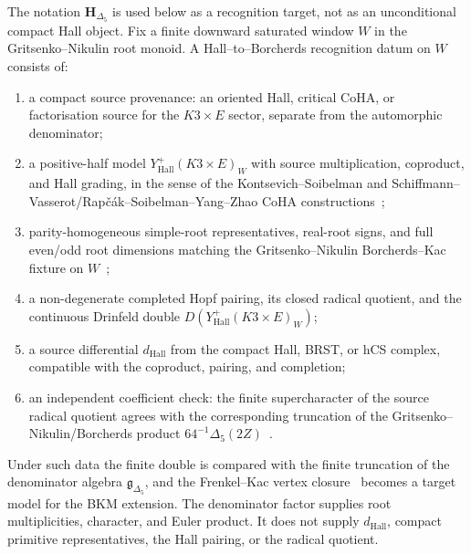 \begin{remark}
\label{rem:ckp-hall-drinfeld-pair}
The notation $\mathbf H_{\Delta_5}$ is used below as a recognition target,
not as an unconditional compact Hall object.  Fix a finite downward
saturated window $W$ in the Gritsenko--Nikulin root monoid.  A
Hall--to--Borcherds recognition datum on $W$ consists of:
\begin{enumerate}
\item a compact source provenance: an oriented Hall, critical CoHA, or
factorisation source for the $K3\times E$ sector, separate from the
automorphic denominator;
\item a positive-half model $Y^+_{\mathrm{Hall}}(K3\times E)_W$ with
source multiplication, coproduct, and Hall grading, in the sense of the
Kontsevich--Soibelman and Schiffmann--Vasserot/Rap\v{c}\'ak--Soibelman--Yang--Zhao
CoHA constructions~\cite{KS11,SchiffmannVasserot2012,RSYZ20};
\item parity-homogeneous simple-root representatives, real-root signs,
and full even/odd root dimensions matching the Gritsenko--Nikulin
Borcherds--Kac fixture on $W$~\cite{GritsenkoNikulin1998,KacBook};
\item a non-degenerate completed Hopf pairing, its closed radical
quotient, and the continuous Drinfeld double
$D(Y^+_{\mathrm{Hall}}(K3\times E)_W)$;
\item a source differential $d_{\mathrm{Hall}}$ from the compact Hall,
BRST, or hCS complex, compatible with the coproduct, pairing, and
completion;
\item an independent coefficient check: the finite supercharacter of the
source radical quotient agrees with the corresponding truncation of the
Gritsenko--Nikulin/Borcherds product
$64^{-1}\Delta_5(2Z)$~\cite{Bor95,GritsenkoNikulin1998}.
\end{enumerate}
Under such data the finite double is compared with the finite truncation
of the denominator algebra $\mathfrak g_{\Delta_5}$, and the
Frenkel--Kac vertex closure~\cite{FrenkelKac1980} becomes a target model
for the BKM extension.  The denominator factor supplies root
multiplicities, character, and Euler product.  It does not supply
$d_{\mathrm{Hall}}$, compact primitive representatives, the Hall pairing,
or the radical quotient.
\end{remark}

